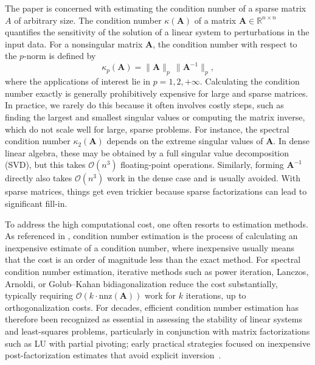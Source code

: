 \documentclass[11pt,a4paper]{article}
\theoremstyle{plain}
\theoremstyle{definition}
\theoremstyle{remark}
\begin{document}
The paper is concerned with estimating the  condition number of a sparse matrix $A$ of arbitrary size. The condition number $\kappa(\mathbf{A})$ of a matrix $\mathbf{A} \in \mathbb{R}^{n \times n}$ quantifies the sensitivity of the solution of a linear system to perturbations in the input data. For a nonsingular matrix $\mathbf{A}$, the condition number with respect to the $p$-norm is defined by
\begin{equation}
\kappa_p(\mathbf{A}) = \|\mathbf{A}\|_p \, \|\mathbf{A}^{-1}\|_p,
\label{eq:condition_number}
\end{equation}
where the applications of interest lie in $p=1, 2, +\infty$.  Calculating the condition number exactly is generally prohibitively expensive for large and sparse matrices. In practice, we rarely do this because it often involves costly steps, such as finding the largest and smallest singular values or computing the matrix inverse, which do not scale well for large, sparse problems. For instance, the spectral condition number $\kappa_2(\mathbf{A})$ depends on the extreme singular values of $\mathbf{A}$. In dense linear algebra, these may be obtained by a full singular value decomposition (SVD), but this takes $\mathcal{O}(n^3)$ floating-point operations. Similarly, forming $\mathbf{A}^{-1}$ directly also takes $\mathcal{O}(n^3)$ work in the dense case and is usually avoided. With sparse matrices, things get even trickier because sparse factorizations can lead to significant fill-in.

To address the high computational cost, one often resorts to estimation methods. As referenced in \cite[Ch. 15]{higham2002accuracy}, condition number estimation is the process of calculating an inexpensive estimate of a condition number, where inexpensive usually means that the cost is an order of magnitude less than the exact method.  For spectral condition number estimation, iterative methods such as power iteration, Lanczos, Arnoldi, or Golub--Kahan bidiagonalization reduce the cost substantially, typically requiring $\mathcal{O}(k \cdot \mathrm{nnz}(\mathbf{A}))$ work for $k$ iterations, up to orthogonalization costs. For decades, efficient condition number estimation has therefore been recognized as essential in assessing the stability of linear systems and least-squares problems, particularly in conjunction with matrix factorizations such as LU with partial pivoting; early practical strategies focused on inexpensive post-factorization estimates that avoid explicit inversion~\cite{hager1984condition,higham1988estimating}.
\end{document}
